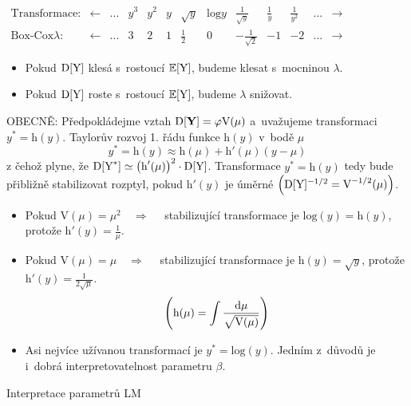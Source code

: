 \begin{table}[h]
\centering
 $ \begin{array}{ *{13}{c} }
\text{Transformace:} & \leftarrow &... &  y^3 &  y^2 &  y & \sqrt{y}  & \text{log}y & \frac{1}{\sqrt{y}}  & \frac{1}{y} & \frac{1}{y^2} &...  & \rightarrow \\
\text{Box-Cox} \lambda : &\leftarrow  &... & 3 & 2 & 1 & \frac{1}{2}  & 0 &  -\frac{1}{\sqrt{2}} & -1 & -2 &... & \rightarrow
\end{array} $
\end{table}

\begin{itemize}
\item Pokud $\mathrm{D}[\text{Y}]$ klesá s~rostoucí $\mathbb{E}[\text{Y}]$, budeme klesat s~mocninou $\lambda$.
\item Pokud $\mathrm{D}[\text{Y}]$ roste s~rostoucí $\mathbb{E}[\text{Y}]$, budeme $\lambda$ snižovat.
\end{itemize}

OBECNĚ: Předpokládejme vztah $\mathrm{D}[\mathbf{Y}] = \varphi \text{V}(\mu)$ a~uvažujeme transformaci $y^* = \text{h}(y)$. Taylorův rozvoj 1. řádu funkce $\text{h}(y)$ v~bodě $\mu$
 $$
 y^* = \text{h}(y) \approx \text{h}(\mu) + \text{h}'(\mu)(y-\mu)
 $$
z čehož plyne, že $\mathrm{D}[\text{Y}^*] \simeq \big(\text{h}'(\mu)\big)^2 \cdot \mathrm{D}[\text{Y}]$.
Transformace $y^* = \text{h}(y)$ tedy bude přibližně stabilizovat rozptyl, pokud $\text{h}'(y)$ je úměrné $\left(\mathrm{D}[\text{Y}]^{-1/2} = \text{V}^{-1/2}(\mu) \right)$.

\begin{itemize}
\item Pokud $\text{V}(\mu) = \mu^2 \quad \Rightarrow \quad$ stabilizující transformace je $\text{log}(y) = \text{h}(y)$, protože $\text{h}'(y) = \frac{1}{\mu}$.
\item Pokud $\text{V}(\mu) = \mu \quad \Rightarrow \quad$ stabilizující transformace je $\text{h}(y) = \sqrt{y}$, protože $\text{h}'(y) = \frac{1}{2 \sqrt{\mu}}$.
 $$
 \left(\text{h}(\mu) = \int \frac{\mathrm{d} \mu}{\sqrt{\text{V}(\mu)}} \right)
 $$
\item Asi nejvíce užívanou transformací je $y^* = \text{log}(y)$. Jedním z~důvodů je i~dobrá interpretovatelnost parametru $\beta$.
\end{itemize}

Interpretace parametrů LM

